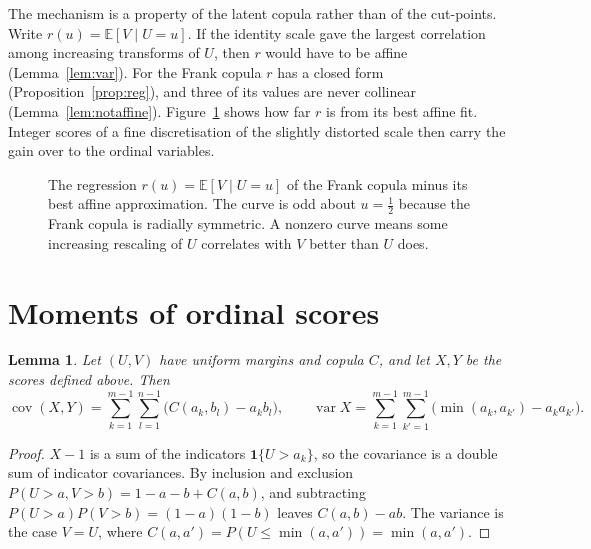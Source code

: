 \documentclass[11pt]{amsart}
\newtheorem{lemma}[thm]{Lemma}
\theoremstyle{definition}
\DeclareMathOperator{\cov}{cov}
\DeclareMathOperator{\var}{var}
\newcommand{\E}{\mathbb{E}}
\newcommand{\rs}{\rho_S}
\begin{document}
The mechanism is a property of the latent copula rather than of the cut-points. Write $r(u)=\E[V\mid U=u]$. If the
identity scale gave the largest correlation among increasing transforms of $U$, then $r$ would have to be affine
(Lemma~\ref{lem:var}). For the Frank copula $r$ has a closed form (Proposition~\ref{prop:reg}), and three of its
values are never collinear (Lemma~\ref{lem:notaffine}). Figure~\ref{fig:reg} shows how far $r$ is from its best affine
fit. Integer scores of a fine discretisation of the slightly distorted scale then carry the gain over to the
ordinal variables.

\begin{figure}[t]
\centering
{}
\caption{The regression $r(u)=\E[V\mid U=u]$ of the Frank copula minus its best affine approximation. The curve
is odd about $u=\tfrac12$ because the Frank copula is radially symmetric. A nonzero curve means some increasing
rescaling of $U$ correlates with $V$ better than $U$ does.}\label{fig:reg}
\end{figure}

\section{Moments of ordinal scores}

\begin{lemma}\label{lem:moments}
Let $(U,V)$ have uniform margins and copula $C$, and let $X,Y$ be the scores defined above. Then
\[
\cov(X,Y)=\sum_{k=1}^{m-1}\sum_{l=1}^{n-1}\bigl(C(a_k,b_l)-a_kb_l\bigr),\qquad
\var X=\sum_{k=1}^{m-1}\sum_{k'=1}^{m-1}\bigl(\min(a_k,a_{k'})-a_ka_{k'}\bigr).
\]
\end{lemma}

\begin{proof}
$X-1$ is a sum of the indicators $\mathbf 1\{U>a_k\}$, so the covariance is a double sum of indicator covariances.
By inclusion and exclusion $P(U>a,V>b)=1-a-b+C(a,b)$, and subtracting $P(U>a)P(V>b)=(1-a)(1-b)$ leaves $C(a,b)-ab$.
The variance is the case $V=U$, where $C(a,a')=P(U\le\min(a,a'))=\min(a,a')$.
\end{proof}
\end{document}
